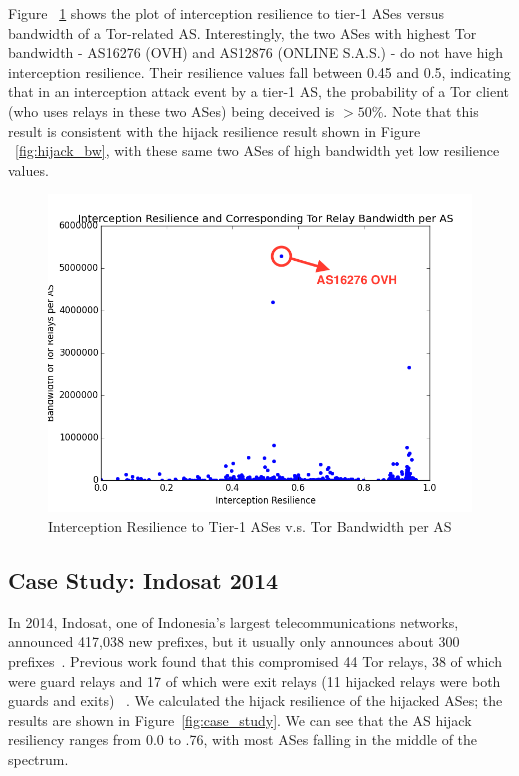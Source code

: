 Figure ~\ref{fig:interception_bw} shows the plot of interception resilience to tier-1 ASes versus bandwidth of a Tor-related AS. Interestingly, the two ASes with highest Tor bandwidth - AS16276 (OVH) and AS12876 (ONLINE S.A.S.) - do not have high interception resilience. Their resilience values fall between 0.45 and 0.5, indicating that in an interception attack event by a tier-1 AS, the probability of a Tor client (who uses relays in these two ASes) being deceived is $> 50\%$. Note that this result is consistent with the hijack resilience result shown in Figure ~\ref{fig:hijack_bw}, with these same two ASes of high bandwidth yet low resilience values. 

\begin{figure}[ht!]
\centering
\includegraphics[width=.4\textwidth]{interception_bandwidth}
\caption{Interception Resilience to Tier-1 ASes v.s. Tor Bandwidth per AS}
\label{fig:interception_bw}
\end{figure}

\subsection{Case Study: Indosat 2014}
In 2014, Indosat, one of Indonesia's largest telecommunications networks, announced 417,038 new prefixes, but it usually only announces about 300 prefixes~\cite{indosat2014}.  Previous work found that this compromised 44 Tor relays, 38 of which were guard relays and 17 of which were exit relays (11 hijacked relays were both guards and exits) ~\cite{sun2015raptor}.  We calculated the hijack resilience of the hijacked ASes; the results are shown in Figure~\ref{fig:case_study}.  We can see that the AS hijack resiliency ranges from 0.0 to .76, with most ASes falling in the middle of the spectrum. 


